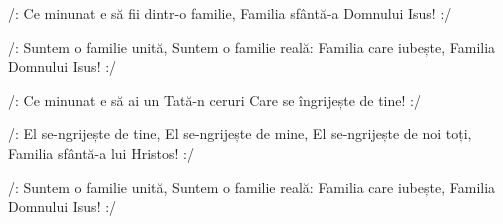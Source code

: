 \beginverse
/: Ce minunat e să fii dintr-o familie,
Familia sfântă-a Domnului Isus! :/
\endverse

\beginchorus
/: Suntem o familie unită,
Suntem o familie reală:
Familia care iubește,
Familia Domnului Isus! :/
\endchorus

\beginverse
/: Ce minunat e să ai un Tată-n ceruri
Care se îngrijește de tine! :/
\endverse

\beginchorus
/: El se-ngrijește de tine,
El se-ngrijește de mine,
El se-ngrijește de noi toți,
Familia sfântă-a lui Hristos! :/
\endchorus

\beginchorus
/: Suntem o familie unită,
Suntem o familie reală:
Familia care iubește,
Familia Domnului Isus! :/
\endchorus
\endsong